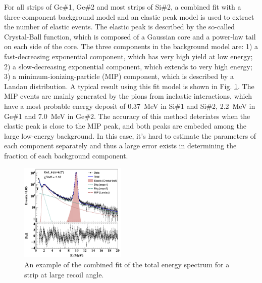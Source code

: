 \documentclass[fleqn,twocolumn,a4paper]{ikpar}
\begin{document}
For all strips of Ge\#1, Ge\#2 and most strips of Si\#2, a combined fit with
a three-component background model and an elastic peak model is used to extract
the number of elastic events.
The elastic peak is described by the so-called Crystal-Ball function\cite{r1}, which
is composed of a Gaussian core and a power-law tail on each side of the core.
The three components in the background model are: 1) a
fast-decreasing exponential component, which has very high yield at low energy; 2)
a slow-decreasing exponential component, which extends to very high energy; 3) a
minimum-ionizing-particle (MIP) component, which is described by a Landau
distribution.
A typical result using this fit model is shown in Fig. \ref{fig:combined_fit}.
The MIP events are mainly generated by the pions from inelastic interactions,
which have a most probable energy deposit of \SI{0.37}{\MeV} in Si\#1 and Si\#2,
\SI{2.2}{\MeV} in Ge\#1 and \SI{7.0}{\MeV} in Ge\#2.
The accuracy of this method deteriates when the elastic peak is close to the MIP
peak, and both peaks are embeded among the large low-energy background.
In this case, it's hard to estimate the parameters of each component separately
and thus a large error exists in determining the fraction of each background component.
\begin{figure}[!htb]
	\includegraphics[width=0.45\textwidth]{./combined_fit.png}
  \caption{An example of the combined fit of the total energy spectrum for a strip at large recoil angle.}
  \label{fig:combined_fit}
\end{figure}

\par
\medskip
\end{document}
